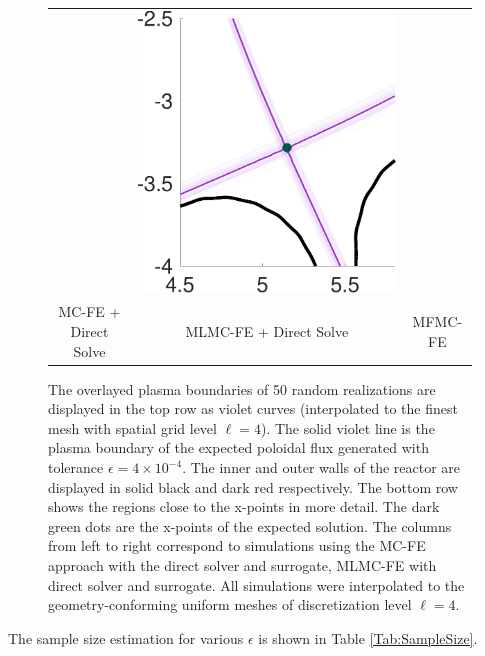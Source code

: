 \begin{figure}[ht!]
\begin{tabular}{ccc}
&\includegraphics[width=0.19\linewidth]{./figures/QoI_MFMC_xptRegion.pdf} 
\\[1ex]
\quad MC-FE + Direct Solve &MLMC-FE + Direct Solve &MFMC-FE  \\[-0.5ex]
\end{tabular}
\caption{The overlayed plasma boundaries of 50 random realizations are 
displayed in the top row as violet curves (interpolated to the finest mesh with spatial grid level $\ell=4$). The solid violet line is the plasma boundary of the expected 
poloidal flux generated with tolerance $\epsilon=4\times 10^{-4}$. 
The inner and outer walls of the reactor are displayed in solid black and 
dark red respectively. The bottom row shows the regions close to the 
x-points in more detail. The dark green dots are the x-points of the expected 
solution. The columns from left to right correspond to simulations using the 
MC-FE approach with the direct solver and surrogate, MLMC-FE with direct 
solver and surrogate. All simulations were interpolated to the geometry-conforming uniform meshes of discretization level $\ell=4$.} 
\label{fig:QoI_plot}
\end{figure}
%





The sample size estimation for various $\epsilon$ is shown in Table \ref{Tab:SampleSize}.



